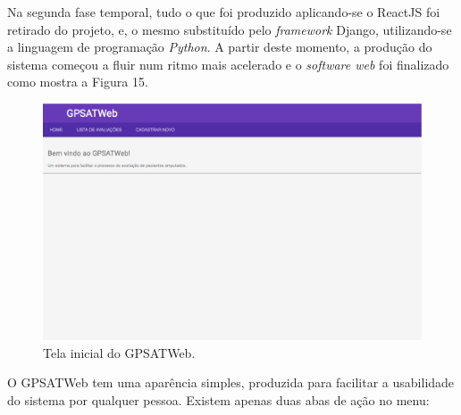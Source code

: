	Na segunda fase temporal, tudo o que foi produzido aplicando-se o ReactJS foi retirado do projeto, e, o mesmo substituído pelo \textit{framework} Django, utilizando-se a linguagem de programação \textit{Python}. A partir deste momento, a produção do sistema começou a fluir num ritmo mais acelerado e o \textit{software web} foi finalizado como mostra a Figura 15.
	\newpage
	\begin{figure}[ht]
	    \centering
	    \label{fig15}
	        \includegraphics[keepaspectratio=true, scale=0.23]{editaveis/images/tela_inicial.eps}
	    \caption{Tela inicial do GPSATWeb.}
	\end{figure} 

	O GPSATWeb tem uma aparência simples, produzida para facilitar a usabilidade do sistema por qualquer pessoa. Existem apenas duas abas de ação no menu:

